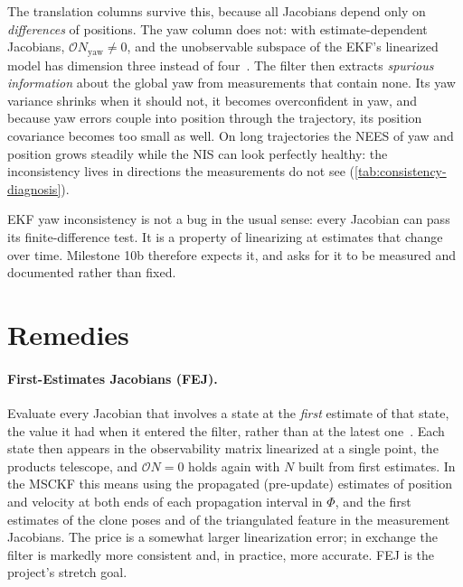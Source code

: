 The translation columns survive this, because all Jacobians depend only on \emph{differences} of positions. The yaw column does
not: with estimate-dependent Jacobians, $\mathcal{O}N_{\text{yaw}} \neq 0$, and the unobservable subspace of the EKF's linearized model has
dimension three instead of four~\cite{huang2010observability, li2013msckf2, hesch2014consistency}. The filter then extracts
\emph{spurious information} about the global yaw from measurements that contain none. Its yaw variance shrinks when it should not, it
becomes overconfident in yaw, and because yaw errors couple into position through the trajectory, its position covariance becomes
too small as well. On long trajectories the NEES of yaw and position grows steadily while the NIS can look perfectly healthy: the
inconsistency lives in directions the measurements do not see (\cref{tab:consistency-diagnosis}).

\begin{keyidea}
EKF yaw inconsistency is not a bug in the usual sense: every Jacobian can pass its finite-difference test. It is a property of
linearizing at estimates that change over time. Milestone 10b therefore expects it, and asks for it to be measured and documented
rather than fixed.
\end{keyidea}

\section{Remedies}

\paragraph{First-Estimates Jacobians (FEJ).} Evaluate every Jacobian that involves a state at the \emph{first} estimate of that
state, the value it had when it entered the filter, rather than at the latest one~\cite{huang2008fej, li2013msckf2}. Each state then
appears in the observability matrix linearized at a single point, the products telescope, and $\mathcal{O}N = 0$ holds again with $N$
built from first estimates. In the MSCKF this means using the propagated (pre-update) estimates of position and velocity at both
ends of each propagation interval in $\Phi$, and the first estimates of the clone poses and of the triangulated feature in the
measurement Jacobians. The price is a somewhat larger linearization error; in exchange the filter is markedly more consistent and,
in practice, more accurate. FEJ is the project's stretch goal.

